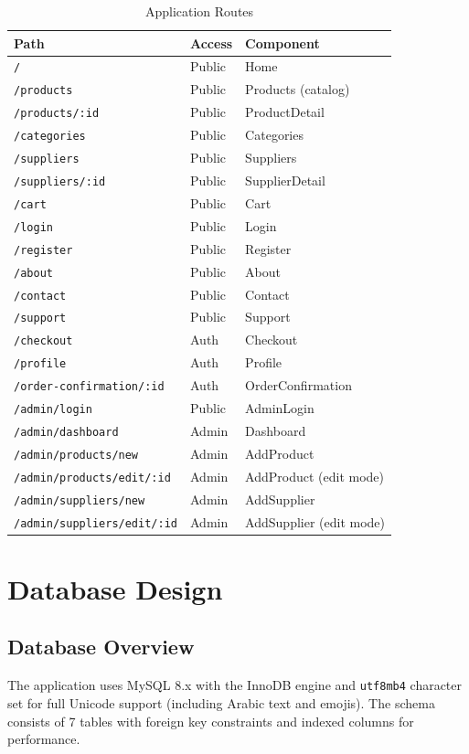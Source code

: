 \documentclass[12pt,a4paper]{report}
\begin{document}
\begin{table}[H]
\centering
\caption{Application Routes}
\label{tab:routes}
\begin{tabularx}{\textwidth}{|l|l|X|}
\hline
\textbf{Path} & \textbf{Access} & \textbf{Component} \\
\hline
\texttt{/} & Public & Home \\
\texttt{/products} & Public & Products (catalog) \\
\texttt{/products/:id} & Public & ProductDetail \\
\texttt{/categories} & Public & Categories \\
\texttt{/suppliers} & Public & Suppliers \\
\texttt{/suppliers/:id} & Public & SupplierDetail \\
\texttt{/cart} & Public & Cart \\
\texttt{/login} & Public & Login \\
\texttt{/register} & Public & Register \\
\texttt{/about} & Public & About \\
\texttt{/contact} & Public & Contact \\
\texttt{/support} & Public & Support \\
\texttt{/checkout} & Auth & Checkout \\
\texttt{/profile} & Auth & Profile \\
\texttt{/order-confirmation/:id} & Auth & OrderConfirmation \\
\texttt{/admin/login} & Public & AdminLogin \\
\texttt{/admin/dashboard} & Admin & Dashboard \\
\texttt{/admin/products/new} & Admin & AddProduct \\
\texttt{/admin/products/edit/:id} & Admin & AddProduct (edit mode) \\
\texttt{/admin/suppliers/new} & Admin & AddSupplier \\
\texttt{/admin/suppliers/edit/:id} & Admin & AddSupplier (edit mode) \\
\hline
\end{tabularx}
\end{table}


\chapter{Database Design}

\section{Database Overview}
The application uses MySQL 8.x with the InnoDB engine and \texttt{utf8mb4} character set for full Unicode support (including Arabic text and emojis). The schema consists of 7 tables with foreign key constraints and indexed columns for performance.
\end{document}
